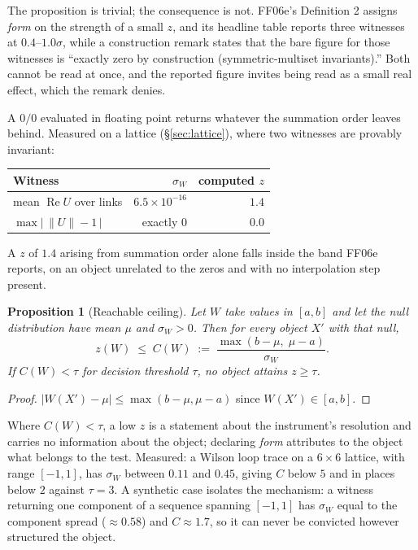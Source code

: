 \documentclass[11pt]{article}
\newtheorem{proposition}{Proposition}
\theoremstyle{remark}
\begin{document}
The proposition is trivial; the consequence is not. FF06e's Definition 2 assigns
\emph{form} on the strength of a small $z$, and its headline table reports three
witnesses at $0.4$--$1.0\sigma$, while a construction remark states that the bare figure
for those witnesses is ``exactly zero by construction (symmetric-multiset invariants).''
Both cannot be read at once, and the reported figure invites being read as a small real
effect, which the remark denies.

A $0/0$ evaluated in floating point returns whatever the summation order leaves behind.
Measured on a lattice (\S\ref{sec:lattice}), where two witnesses are provably invariant:

\begin{center}\small
\begin{tabular}{lrr}
\toprule
Witness & $\sigma_W$ & computed $z$ \\
\midrule
mean $\operatorname{Re}U$ over links & $6.5\times10^{-16}$ & $\mathbf{1.4}$ \\
$\max\bigl|\,\|U\|-1\,\bigr|$ & exactly $0$ & $0.0$ \\
\bottomrule
\end{tabular}
\end{center}

A $z$ of $1.4$ arising from summation order alone falls inside the band FF06e reports,
on an object unrelated to the zeros and with no interpolation step present.

\begin{proposition}[Reachable ceiling]\label{prop:ceiling}
Let $W$ take values in $[a,b]$ and let the null distribution have mean $\mu$ and
$\sigma_W>0$. Then for every object $X'$ with that null,
\[
  z(W) \;\le\; C(W) \;:=\; \frac{\max(b-\mu,\;\mu-a)}{\sigma_W}.
\]
If $C(W)<\tau$ for decision threshold $\tau$, no object attains $z\ge\tau$.
\end{proposition}
\begin{proof}
$|W(X')-\mu|\le\max(b-\mu,\mu-a)$ since $W(X')\in[a,b]$.
\end{proof}

Where $C(W)<\tau$, a low $z$ is a statement about the instrument's resolution and carries
no information about the object; declaring \emph{form} attributes to the object what
belongs to the test. Measured: a Wilson loop trace on a $6\times6$ lattice, with range
$[-1,1]$, has $\sigma_W$ between $0.11$ and $0.45$, giving $C$ below $5$ and in places
below $2$ against $\tau=3$. A synthetic case isolates the mechanism: a witness returning
one component of a sequence spanning $[-1,1]$ has $\sigma_W$ equal to the component
spread ($\approx0.58$) and $C\approx1.7$, so it can never be convicted however structured
the object.
\end{document}
